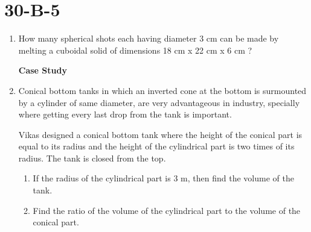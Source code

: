 \documentclass[15pt]{article}
\begin{document}
       \section{30-B-5}
  \begin{enumerate}
     \item  How many spherical shots each having diameter 3 cm can be made by melting a cuboidal solid of dimensions 18 cm x 22 cm x 6 cm ?
        \begin{center}
           \textbf{Case Study}
       \end{center}
     \item Conical bottom tanks in which an inverted cone at the bottom is surmounted by a cylinder of same diameter, are very advantageous in industry, specially where getting every last drop from the tank is important.

       Vikas  designed a conical bottom tank where the height of the conical part is equal to its radius and the height of the cylindrical part is two times of its radius. The tank is closed from the top.
       \begin{enumerate}
           \item If the radius of the cylindrical part is 3 m, then find the volume of the tank.
           \item Find the ratio of the volume of the cylindrical part to the volume of the conical part.
       \end{enumerate}
       
       
\end{enumerate}
\end{document}
